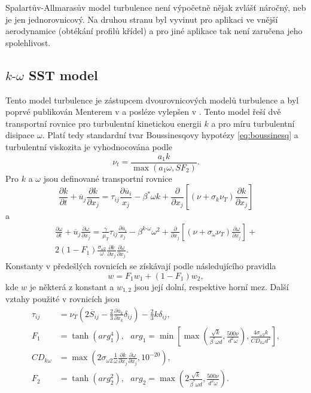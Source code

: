 Spalartův-Allmarasův model turbulence není výpočetně nějak zvlášť náročný, neb je jen jednorovnicový. Na druhou stranu byl vyvinut pro aplikaci ve vnější aerodynamice (obtékání profilů křídel) a pro jiné aplikace tak není zaručena jeho spolehlivost.

\subsection{$k\text{-}\omega$ SST model}

Tento model turbulence je zástupcem dvourovnicových modelů turbulence a byl poprvé publikován Menterem v \cite{menter1994two} a posléze vylepšen v \cite{menter2003ten}. Tento model řeší dvě transportní rovnice pro turbulentní kinetickou energii $ k $ a pro míru turbulentní disipace $ \omega $. Platí tedy standardní tvar Boussinesqovy hypotézy \ref{eq:boussinesq} a turbulentní viskozita je vyhodnocována podle
\begin{equation}
\nu_t = \frac{a_1 k}{\max(a_1 \omega,SF_2)}.
\end{equation}
Pro $ k $ a $\omega$ jsou definované transportní rovnice
\begin{equation}
\frac{\partial k}{\partial t} + \overline{u}_j\frac{\partial k}{\partial x_j} = \tau_{ij}\frac{\partial \overline{u}_i}{x_j} - \beta^\ast \omega k + \frac{\partial}{\partial x_j} \left[ (\nu + \sigma_k \nu_T)\frac{\partial k}{\partial x_j} \right]
\end{equation}
a
\begin{multline}
\frac{\partial \omega}{\partial t} + \overline{u}_j\frac{\partial \omega}{\partial x_j} = \frac{\gamma}{\mu_T}\tau_{ij}\frac{\partial \overline{u}_i}{x_j} - \beta^{k\text{-}\omega} \omega^2 + \frac{\partial}{\partial x_j} \left[ (\nu + \sigma_\omega \nu_T)\frac{\partial \omega}{\partial x_j} \right] + \\ 2(1-F_1)\frac{\sigma_{\omega 2}}{\omega}\frac{\partial k}{\partial x_j}\frac{\partial \omega}{\partial x_j}.
\end{multline}
Konstanty v předešlých rovnicích se získávají podle následujícího pravidla
\begin{equation}
w = F_1 w_1 + (1-F_1)w_2,
\end{equation}
kde $ w $ je některá z konstant a $ w_{1,2} $ jsou její dolní, respektive horní mez. Další vztahy použité v rovnicích jsou
\begin{align*}
\tau_{ij} &= \nu_T \left( 2\overline{S}_{ij} - \frac{2}{3} \frac{\partial \overline{u}_k}{\partial x_k} \delta_{ij} \right) - \frac{2}{3}k\delta_{ij}, \\
F_1 &= \tanh(arg_1^4), \,\,\,\, arg_1 = \min\left[ \max \left( \frac{\sqrt{k}}{\beta^\ast \omega d}, \frac{500\nu}{d^2 \omega} \right), \frac{4 \sigma_{\omega2} k}{CD_{k\omega}d^2} \right],\\
CD_{k\omega} &= \max\left( 2 \sigma_{\omega2} \frac{1}{\omega} \frac{\partial k}{\partial x_j} \frac{\partial \omega}{\partial x_j}, 10^{-20} \right),\\
F_2 &= \tanh(arg_2^2),  \,\,\,\, arg_2 = \max \left( 2\frac{\sqrt{k}}{\beta^\ast \omega d}, \frac{500\nu}{d^2 \omega} \right).
\end{align*}
